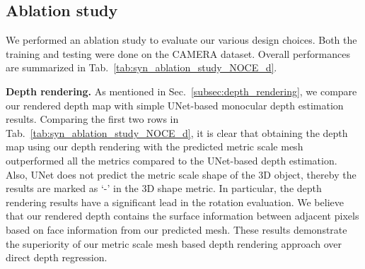 \documentclass[letterpaper, 10 pt, journal, twoside]{IEEEtran}
\newcommand{\tabref}[1]{Tab.~\ref{#1}}
\newcommand{\secref}[1]{Sec.~\ref{#1}}
\begin{document}
\subsection{Ablation study}
\label{subsec:ablation_study}
We performed an ablation study to evaluate our various design choices.
Both the training and testing were done on the CAMERA dataset.
Overall performances are summarized in \tabref{tab:syn_ablation_study_NOCE_d}.

\noindent{}\textbf{Depth rendering.} 
As mentioned in \secref{subsec:depth_rendering}, we compare our rendered depth map with simple UNet-based \cite{ronneberger2015u} monocular depth estimation results.
Comparing the first two rows in \tabref{tab:syn_ablation_study_NOCE_d}, it is clear that obtaining the depth map using our depth rendering with the predicted metric scale mesh outperformed all the metrics compared to the UNet-based depth estimation.
Also, UNet does not predict the metric scale shape of the 3D object, thereby the results are marked as `-' in the 3D shape metric.
In particular, the depth rendering results have a significant lead in the rotation evaluation.
We believe that our rendered depth contains the surface information between adjacent pixels based on face information from our predicted mesh.
These results demonstrate the superiority of our metric scale mesh based depth rendering approach over direct depth regression.


\begin{table*}
\centering
    \caption{\textbf{Quantitative comparison with the state-of-the-art methods on the REAL275 dataset.}
    Empty entries either could not be evaluated, or were not reported in the original paper.
    }
    \label{tab:real_rgbd_sota_compare}
\end{table*}
\end{document}
